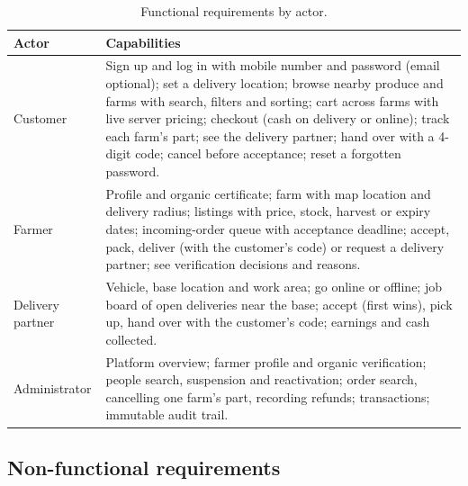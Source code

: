 \documentclass[11pt,a4paper]{article}
\begin{document}
\begin{table}[H]\centering\small
\begin{tabularx}{\linewidth}{@{}p{2.7cm}L@{}}
\toprule
\textbf{Actor} & \textbf{Capabilities} \\
\midrule
Customer & Sign up and log in with mobile number and password (email optional); set a delivery location; browse nearby produce and farms with search, filters and sorting; cart across farms with live server pricing; checkout (cash on delivery or online); track each farm's part; see the delivery partner; hand over with a 4-digit code; cancel before acceptance; reset a forgotten password. \\
Farmer & Profile and organic certificate; farm with map location and delivery radius; listings with price, stock, harvest or expiry dates; incoming-order queue with acceptance deadline; accept, pack, deliver (with the customer's code) or request a delivery partner; see verification decisions and reasons. \\
Delivery partner & Vehicle, base location and work area; go online or offline; job board of open deliveries near the base; accept (first wins), pick up, hand over with the customer's code; earnings and cash collected. \\
Administrator & Platform overview; farmer profile and organic verification; people search, suspension and reactivation; order search, cancelling one farm's part, recording refunds; transactions; immutable audit trail. \\
\bottomrule
\end{tabularx}
\caption{Functional requirements by actor.}
\end{table}

\subsection{Non-functional requirements}
\end{document}
